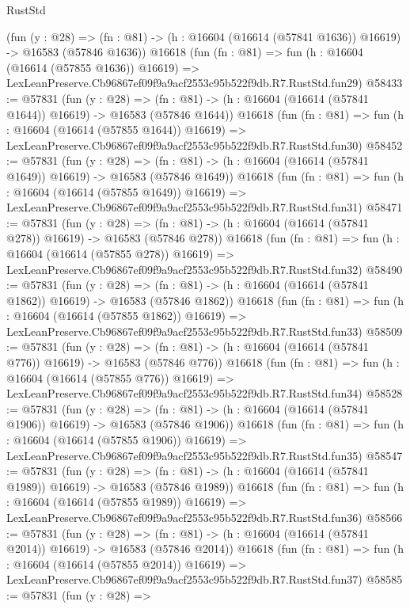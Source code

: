 \begin{lexlean}{RustStd}
\begin{coremodule}
    (fun (y : @28) =>
    (fn : @81) -> (h : @16604 (@16614 (@57841 @1636)) @16619) -> @16583 (@57846 @1636))
    @16618
    (fun (fn : @81) =>
    fun (h : @16604 (@16614 (@57855 @1636)) @16619) =>
    LexLeanPreserve.Cb96867ef09f9a9acf2553c95b522f9db.R7.RustStd.fun29)
@58433 := @57831
    (fun (y : @28) =>
    (fn : @81) -> (h : @16604 (@16614 (@57841 @1644)) @16619) -> @16583 (@57846 @1644))
    @16618
    (fun (fn : @81) =>
    fun (h : @16604 (@16614 (@57855 @1644)) @16619) =>
    LexLeanPreserve.Cb96867ef09f9a9acf2553c95b522f9db.R7.RustStd.fun30)
@58452 := @57831
    (fun (y : @28) =>
    (fn : @81) -> (h : @16604 (@16614 (@57841 @1649)) @16619) -> @16583 (@57846 @1649))
    @16618
    (fun (fn : @81) =>
    fun (h : @16604 (@16614 (@57855 @1649)) @16619) =>
    LexLeanPreserve.Cb96867ef09f9a9acf2553c95b522f9db.R7.RustStd.fun31)
@58471 := @57831
    (fun (y : @28) =>
    (fn : @81) -> (h : @16604 (@16614 (@57841 @278)) @16619) -> @16583 (@57846 @278))
    @16618
    (fun (fn : @81) =>
    fun (h : @16604 (@16614 (@57855 @278)) @16619) =>
    LexLeanPreserve.Cb96867ef09f9a9acf2553c95b522f9db.R7.RustStd.fun32)
@58490 := @57831
    (fun (y : @28) =>
    (fn : @81) -> (h : @16604 (@16614 (@57841 @1862)) @16619) -> @16583 (@57846 @1862))
    @16618
    (fun (fn : @81) =>
    fun (h : @16604 (@16614 (@57855 @1862)) @16619) =>
    LexLeanPreserve.Cb96867ef09f9a9acf2553c95b522f9db.R7.RustStd.fun33)
@58509 := @57831
    (fun (y : @28) =>
    (fn : @81) -> (h : @16604 (@16614 (@57841 @776)) @16619) -> @16583 (@57846 @776))
    @16618
    (fun (fn : @81) =>
    fun (h : @16604 (@16614 (@57855 @776)) @16619) =>
    LexLeanPreserve.Cb96867ef09f9a9acf2553c95b522f9db.R7.RustStd.fun34)
@58528 := @57831
    (fun (y : @28) =>
    (fn : @81) -> (h : @16604 (@16614 (@57841 @1906)) @16619) -> @16583 (@57846 @1906))
    @16618
    (fun (fn : @81) =>
    fun (h : @16604 (@16614 (@57855 @1906)) @16619) =>
    LexLeanPreserve.Cb96867ef09f9a9acf2553c95b522f9db.R7.RustStd.fun35)
@58547 := @57831
    (fun (y : @28) =>
    (fn : @81) -> (h : @16604 (@16614 (@57841 @1989)) @16619) -> @16583 (@57846 @1989))
    @16618
    (fun (fn : @81) =>
    fun (h : @16604 (@16614 (@57855 @1989)) @16619) =>
    LexLeanPreserve.Cb96867ef09f9a9acf2553c95b522f9db.R7.RustStd.fun36)
@58566 := @57831
    (fun (y : @28) =>
    (fn : @81) -> (h : @16604 (@16614 (@57841 @2014)) @16619) -> @16583 (@57846 @2014))
    @16618
    (fun (fn : @81) =>
    fun (h : @16604 (@16614 (@57855 @2014)) @16619) =>
    LexLeanPreserve.Cb96867ef09f9a9acf2553c95b522f9db.R7.RustStd.fun37)
@58585 := @57831
    (fun (y : @28) =>

\end{coremodule}
\end{lexlean}
